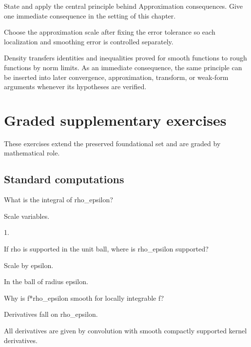 \begin{exercise}\label{exr:iii22-08}
State and apply the central principle behind Approximation consequences. Give one immediate consequence in the setting of this chapter.
\end{exercise}
\begin{hint}
Choose the approximation scale after fixing the error tolerance so each localization and smoothing error is controlled separately.
\end{hint}
\begin{solution}
Density transfers identities and inequalities proved for smooth functions to rough functions by norm limits. As an immediate consequence, the same principle can be inserted into later convergence, approximation, transform, or weak-form arguments whenever its hypotheses are verified.
\end{solution}


\section{Graded supplementary exercises}
These exercises extend the preserved foundational set and are graded by mathematical role.

\subsection*{Standard computations}

\begin{exercise}\label{exr:iii22-expand-01}
What is the integral of rho\_epsilon?
\end{exercise}
\begin{hint}
Scale variables.
\end{hint}
\begin{solution}
1.
\end{solution}

\begin{exercise}\label{exr:iii22-expand-02}
If rho is supported in the unit ball, where is rho\_epsilon supported?
\end{exercise}
\begin{hint}
Scale by epsilon.
\end{hint}
\begin{solution}
In the ball of radius epsilon.
\end{solution}

\begin{exercise}[Smoothness]\label{exr:iii22-expand-03}
Why is f*rho\_epsilon smooth for locally integrable f?
\end{exercise}
\begin{hint}
Derivatives fall on rho\_epsilon.
\end{hint}
\begin{solution}
All derivatives are given by convolution with smooth compactly supported kernel derivatives.
\end{solution}

